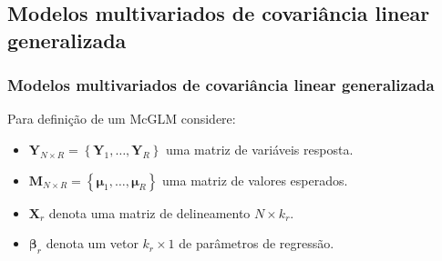 \documentclass[10pt,
  aspectratio=169,
  serif,
  mathserif,
  professionalfont,
  compress,
  handout,
  ]{beamer}\usepackage[]{graphicx}\usepackage[]{color}
\begin{document}
\subsection{Modelos multivariados de covariância linear generalizada}

\begin{frame}
\frametitle{Modelos multivariados de covariância linear generalizada}

Para definição de um McGLM considere:

\begin{itemize}
  
  \itemsep 2ex
  
  \item $\boldsymbol{Y}_{N \times R} = \left \{ \boldsymbol{Y}_1, \dots, \boldsymbol{Y}_R \right \}$ uma  matriz de variáveis resposta.
  
  \item $\boldsymbol{M}_{N \times R} = \left \{ \boldsymbol{\mu}_1, \dots, \boldsymbol{\mu}_R \right \}$ uma matriz de valores esperados.
  
    \item $\boldsymbol{X}_r$ denota uma matriz de delineamento $N \times k_r$.
  
  \item $\boldsymbol{\beta}_r$ denota um vetor $k_r \times 1$ de parâmetros de regressão.
  
\end{itemize}

\end{frame}

\end{document}
